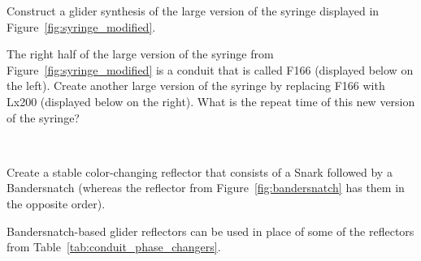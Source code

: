 \begin{multicols}{2}
\begin{problemstar}
	\end{problemstar}
	
	
	\mfilbreak
	
	
	\begin{problem}\label{exer:syringe_glider_synth} 
		Construct a glider synthesis of the large version of the syringe displayed in Figure~\ref{fig:syringe_modified}.
	\end{problem}
	
	
	\mfilbreak
	
	
	\begin{problemstar}\label{exer:syringe_Lx200} 
		The right half of the large version of the syringe from Figure~\ref{fig:syringe_modified} is a conduit that is called F166 (displayed below on the left). Create another large version of the syringe by replacing F166 with Lx200 (displayed below on the right). What is the repeat time of this new version of the syringe?
		
		\begin{center}
			~\quad~
		\end{center}
	
		
	\end{problemstar}


	\mfilbreak
	
	
	\begin{problem}\label{exer:bandersnatch_snark_other_side} 
		Create a stable color-changing reflector that consists of a Snark followed by a Bandersnatch (whereas the reflector from Figure~\ref{fig:bandersnatch} has them in the opposite order).
	\end{problem}


	\mfilbreak
	
	
	\begin{problem}\label{exer:bandersnatch_reflector_timing} 
		Bandersnatch-based glider reflectors can be used in place of some of the reflectors from Table~\ref{tab:conduit_phase_changers}.\smallskip
		

\end{problem}
\end{multicols}

